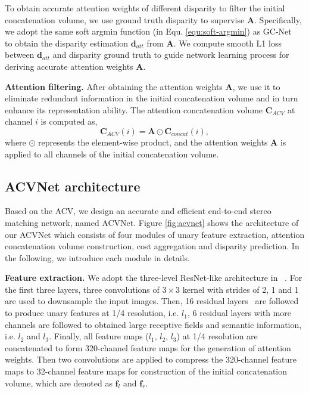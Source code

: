 \documentclass[10pt,twocolumn,letterpaper]{article}
\begin{document}
To obtain accurate attention weights of different disparity to filter the initial concatenation volume, we use ground truth disparity to supervise $\mathbf{A}$. Specifically, we 
adopt the same soft argmin function (in Equ. \ref{equ:soft-argmin}) as GC-Net~\cite{kendall2017end} to obtain the disparity estimation $\mathbf{d}_{att}$ from $\mathbf{A}$. We compute smooth L1 loss between $\mathbf{d}_{att}$ and disparity ground truth to guide network learning process for deriving accurate attention weights $\mathbf{A}$.

\textbf{Attention filtering.} After obtaining the attention weights $\mathbf{A}$, we use it to eliminate redundant information in the initial concatenation volume and in turn enhance its representation ability. The attention concatenation volume $\mathbf{C}_{ACV}$ at channel $i$ is computed as,
\begin{equation}
\mathbf{C}_{ACV}(i)=\mathbf{A}\odot\mathbf{C}_{concat}(i),
\label{equ:acv}
\end{equation}
where $\odot$ represents the element-wise product, and the attention weights $\mathbf{A}$ is applied to all channels of the initial concatenation volume.

\subsection{ACVNet architecture} \label{sec:architecture}
Based on the ACV, we design an accurate and efficient end-to-end stereo matching network, named ACVNet. Figure \ref{fig:acvnet} shows the architecture of our ACVNet which consists of four modules of unary feature extraction, attention concatenation volume construction, cost aggregation and disparity prediction. In the following, we introduce each module in details.

\textbf{Feature extraction.} We adopt the three-level ResNet-like architecture in ~\cite{guo2019group}. For the first three layers, three convolutions of $3{\times}3$ kernel with strides of 2, 1 and 1 are used to downsample the input images. Then, 16 residual layers~\cite{he2016deep} are followed to produce unary features at 1/4 resolution, i.e. $l_1$, 6 residual layers with more channels are followed to obtained large receptive fields and semantic information, i.e. $l_2$ and $l_3$. Finally, all feature maps ($l_1$, $l_2$, $l_3$) at 1/4 resolution are concatenated to form 320-channel feature maps for the generation of attention weights. Then two convolutions are applied to compress the 320-channel feature maps to 32-channel feature maps for construction of the initial concatenation volume, which are denoted as $\mathbf{f}_l$ and $\mathbf{f}_r$.
\end{document}
